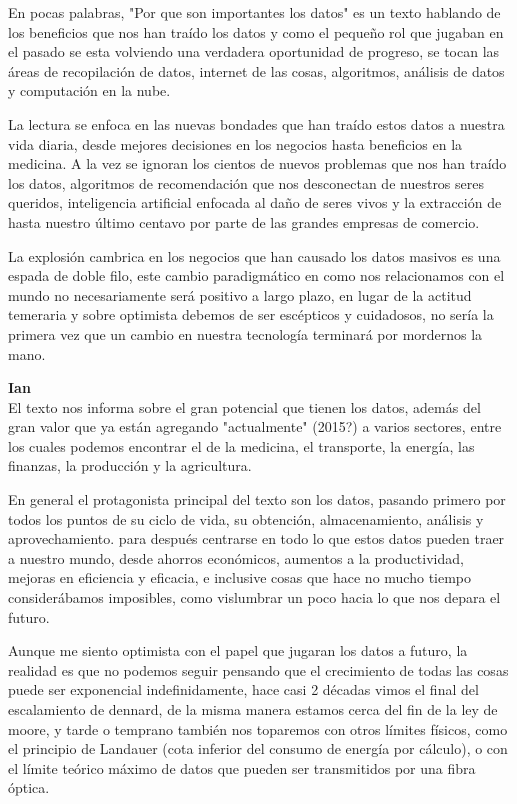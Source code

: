 \documentclass[12pt,a4paper]{article}
\begin{document}
\begin{enumerate}
\begin{enumerate}
				En pocas palabras, "Por que son importantes los datos"
				es un texto hablando de los beneficios que nos han traído los
				datos y como el pequeño rol que jugaban en el pasado
				se esta volviendo una verdadera oportunidad de progreso,
				se tocan las áreas de recopilación de datos, internet de las cosas,
				algoritmos, análisis de datos y computación en la nube. 

				La lectura se enfoca en las nuevas bondades que han traído
				estos datos a nuestra vida diaria, desde mejores decisiones en los
				negocios hasta beneficios en la medicina.
				A la vez se ignoran los cientos de nuevos problemas que nos han traído
				los datos, algoritmos de recomendación que nos desconectan de nuestros
				seres queridos, inteligencia artificial enfocada al daño de seres
				vivos y la extracción de hasta nuestro último centavo por parte
				de las grandes empresas de comercio.

				La explosión cambrica en los negocios que han causado
				los datos masivos es una espada de doble filo, este cambio
				paradigmático en como nos relacionamos con el mundo no necesariamente
				será positivo a largo plazo, en lugar de la actitud temeraria y
				sobre optimista debemos de ser escépticos y cuidadosos, no
				sería la primera vez que un cambio en nuestra tecnología
				terminará por mordernos la mano.

				\textbf{Ian}\\
				El texto nos informa sobre el gran potencial que tienen los datos, 
				además del gran valor que ya están agregando "actualmente" (2015?) 
				a varios sectores, entre los cuales podemos encontrar el de la medicina, 
				el transporte, la energía, las finanzas, la producción y la agricultura.

				En general el protagonista principal del texto son los datos, pasando
				primero por todos los puntos de su ciclo de vida, su obtención, 
				almacenamiento, análisis y aprovechamiento. para después centrarse 
				en todo lo que estos datos pueden traer a nuestro mundo, desde ahorros 
				económicos, aumentos a la productividad, mejoras en eficiencia y 
				eficacia, e inclusive cosas que hace no mucho tiempo considerábamos 
				imposibles, como vislumbrar un poco hacia lo que nos depara el futuro.

				Aunque me siento optimista con el papel que jugaran los datos a 
				futuro, la realidad es que no podemos seguir pensando que el
				crecimiento de todas las cosas puede ser exponencial indefinidamente, 
				hace casi 2 décadas vimos el final del escalamiento de dennard, 
				de la misma manera estamos cerca del fin de la ley de moore, y tarde
				o temprano también nos toparemos con otros límites físicos, como el 
				principio de Landauer (cota inferior del consumo de energía por
				cálculo), o con el límite teórico máximo de datos que pueden ser
				transmitidos por una fibra óptica.


\end{enumerate}
\end{enumerate}
\end{document}
